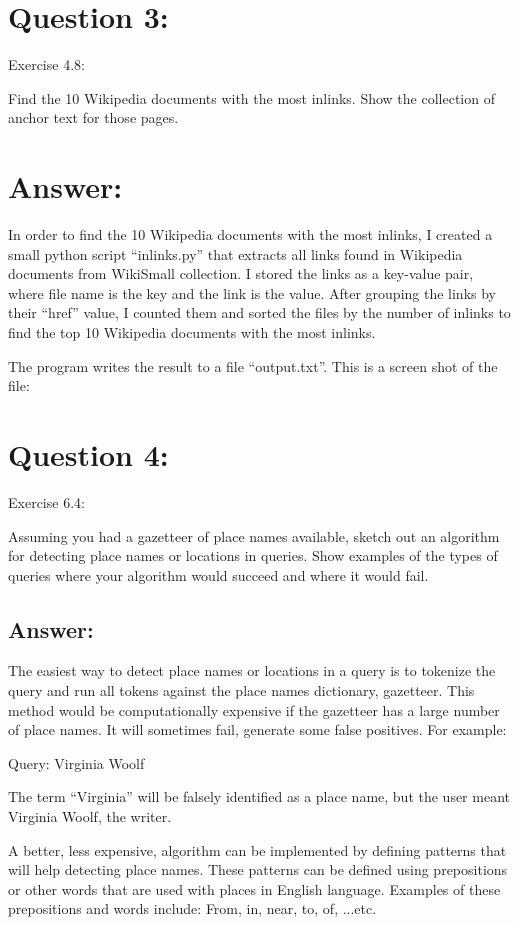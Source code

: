 \documentclass[a4paper, 11pt]{article}
\begin{document}
\section*{Question 3:}
Exercise 4.8:

Find the 10 Wikipedia documents with the most inlinks. Show the collection of anchor text for those pages.

\section*{Answer:}

In order to find the 10 Wikipedia documents with the most inlinks, I created a small python script ``inlinks.py'' that extracts all links found in Wikipedia documents from WikiSmall collection. I stored the links as a key-value pair, where file name is the key and the link is the value. After grouping the links by their ``href'' value, I counted them and sorted the files by the number of inlinks to find the top 10  Wikipedia documents with the most inlinks.


The program writes the result to a file ``output.txt''. This is a screen shot of the file:



\section*{Question 4:}
Exercise 6.4: 

Assuming you had a gazetteer of place names available, sketch out an algorithm for detecting place names or locations in queries. Show examples of the types of queries where your algorithm would succeed and where it would fail.

\subsection*{Answer:}
The easiest way to detect place names or locations in a query is to tokenize the query and run all tokens against the place names dictionary, gazetteer. This method would be computationally expensive if the gazetteer has a large number of place names. It will sometimes fail, generate some false positives. For example:

Query: Virginia Woolf

The term ``Virginia'' will be falsely identified as a place name, but the user meant Virginia Woolf, the writer.

A better, less expensive, algorithm can be implemented by defining patterns that will help detecting place names. These patterns can be defined using prepositions or other words that are used with places in English language. Examples of these prepositions and words include: From, in, near, to, of, ...etc.
\end{document}
